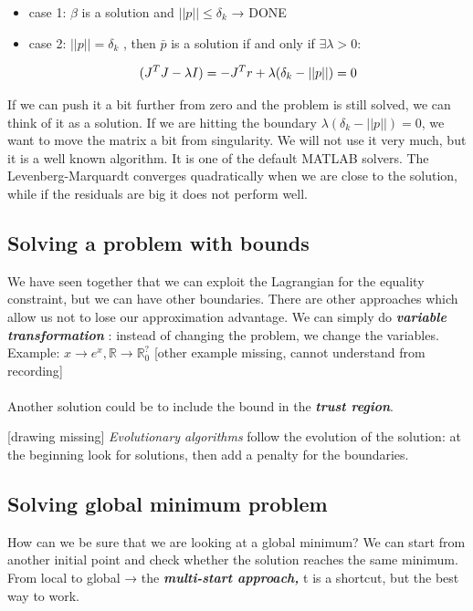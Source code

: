 \begin{itemize}
\item
  case 1: $\beta$ is a solution and $||p||\leq\delta_k$ → DONE
\item
  case 2: $||p||=\delta_k$ , then $\bar{p}$ is a solution if and only if
  $\exists \lambda > 0$:

  $$
    (J^TJ-\lambda I)=-J^Tr \\ + \lambda(\delta_k-||p||)=0
    $$
\end{itemize}
\noindent
If we can push it a bit further from zero and the problem is still
solved, we can think of it as a solution. If we are hitting the boundary
$\lambda(\delta_k-||p||)=0$, we want to move the matrix a bit from
singularity. We will not use it very much, but it is a well known
algorithm. It is one of the default MATLAB solvers. The
Levenberg-Marquardt converges quadratically when we are close to the
solution, while if the residuals are big it does not perform well.


\subsection{Solving a problem with bounds}
We have seen together that we can exploit the Lagrangian for the
  equality constraint, but we can have other boundaries. There are other
  approaches which allow us not to lose our approximation advantage. We
  can simply do \textbf{\emph{variable transformation}} : instead of
  changing the problem, we change the variables.
\noindent
Example: $x \rightarrow e^x, \mathbb{R} \rightarrow \mathbb{R}_0^?$
{[}other example missing, cannot understand from recording{]}
\\
\\
\noindent
 Another solution could be to include the bound in the \textbf{\emph{trust region}}.

{[}drawing missing{]}
\noindent
\emph{Evolutionary algorithms} follow the evolution of the solution: at
the beginning look for solutions, then add a penalty for the boundaries.

\subsection{Solving global minimum problem}

How can we be sure that we are looking at a global minimum? We can start
from another initial point and check whether the solution reaches the
same minimum.
\noindent
From local to global → the \textbf{\emph{multi-start approach,}} t is a
shortcut, but the best way to work.

